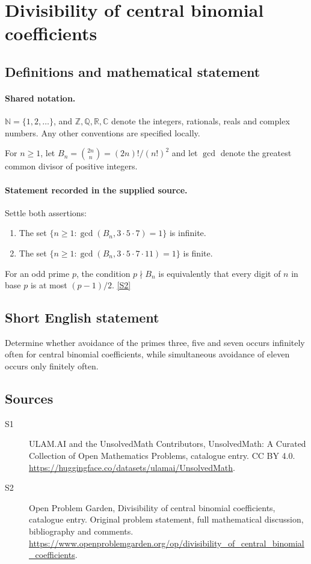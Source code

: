\documentclass[11pt]{article}
\newcommand{\sref}[2]{\hyperlink{source:#1:#2}{[S#2]}}
\begin{document}
\section{Divisibility of central binomial coefficients}\label{statement}

\subsection{Definitions and mathematical statement}

\paragraph{Shared notation.}$\mathbb N=\{1,2,\ldots\}$, and $\mathbb Z,\mathbb Q,\mathbb R,\mathbb C$ denote the integers, rationals, reals and complex numbers. Any other conventions are specified locally.


For $n\ge1$, let $B_n=\binom{2n}{n}=(2n)!/(n!)^2$ and let $\gcd$ denote the greatest common divisor of positive integers.
\paragraph{Statement recorded in the supplied source.}
Settle both assertions:
\begin{enumerate}
\item The set $\{n\ge1:\gcd(B_n,3\cdot5\cdot7)=1\}$ is infinite.
\item The set $\{n\ge1:\gcd(B_n,3\cdot5\cdot7\cdot11)=1\}$ is finite.
\end{enumerate}
For an odd prime $p$, the condition $p\nmid B_n$ is equivalently that every digit of $n$ in base $p$ is at most $(p-1)/2$. \sref{statement}{2}
\subsection{Short English statement}
Determine whether avoidance of the primes three, five and seven occurs infinitely often for central binomial coefficients, while simultaneous avoidance of eleven occurs only finitely often.
\subsection{Sources}
\begin{description}
\item[\hypertarget{source:statement:1}{S1}] ULAM.AI and the UnsolvedMath Contributors, UnsolvedMath: A Curated Collection of Open Mathematics Problems, catalogue entry. CC BY 4.0. \url{https://huggingface.co/datasets/ulamai/UnsolvedMath}.
\item[\hypertarget{source:statement:2}{S2}] Open Problem Garden, Divisibility of central binomial coefficients, catalogue entry. Original problem statement, full mathematical discussion, bibliography and comments. \url{https://www.openproblemgarden.org/op/divisibility_of_central_binomial_coefficients}.
\end{description}
\label{end:statement}
\end{document}
